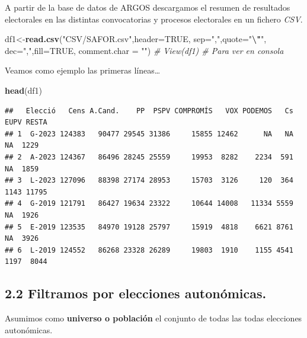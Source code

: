 \documentclass[
]{article}
\newenvironment{Shaded}{\begin{snugshade}}{\end{snugshade}}
\newcommand{\AttributeTok}[1]{\textcolor[rgb]{0.13,0.29,0.53}{#1}}
\newcommand{\CommentTok}[1]{\textcolor[rgb]{0.56,0.35,0.01}{\textit{#1}}}
\newcommand{\ConstantTok}[1]{\textcolor[rgb]{0.56,0.35,0.01}{#1}}
\newcommand{\FunctionTok}[1]{\textcolor[rgb]{0.13,0.29,0.53}{\textbf{#1}}}
\newcommand{\NormalTok}[1]{#1}
\newcommand{\OtherTok}[1]{\textcolor[rgb]{0.56,0.35,0.01}{#1}}
\newcommand{\SpecialCharTok}[1]{\textcolor[rgb]{0.81,0.36,0.00}{\textbf{#1}}}
\newcommand{\StringTok}[1]{\textcolor[rgb]{0.31,0.60,0.02}{#1}}
\begin{document}
A partir de la base de datos de ARGOS descargamos el resumen de
resultados electorales en las distintas convocatorias y procesos
electorales en un fichero \emph{CSV}.

\begin{Shaded}
\begin{Highlighting}[]
\NormalTok{  df1}\OtherTok{\textless{}{-}}\FunctionTok{read.csv}\NormalTok{(}\StringTok{"CSV/SAFOR.csv"}\NormalTok{,}\AttributeTok{header=}\ConstantTok{TRUE}\NormalTok{, }\AttributeTok{sep=}\StringTok{","}\NormalTok{,}\AttributeTok{quote=}\StringTok{"}\SpecialCharTok{\textbackslash{}"}\StringTok{\textquotesingle{}"}\NormalTok{, }\AttributeTok{dec=}\StringTok{","}\NormalTok{,}\AttributeTok{fill=}\ConstantTok{TRUE}\NormalTok{,}
                \AttributeTok{comment.char =} \StringTok{""}\NormalTok{)}
  \CommentTok{\# View(df1) \# Para ver en consola}
\end{Highlighting}
\end{Shaded}

Veamos como ejemplo las primeras líneas\ldots{}

\begin{Shaded}
\begin{Highlighting}[]
\FunctionTok{head}\NormalTok{(df1)}
\end{Highlighting}
\end{Shaded}

\begin{verbatim}
##   Elecció   Cens A.Cand.    PP  PSPV COMPROMÍS   VOX PODEMOS   Cs EUPV RESTA
## 1  G-2023 124383   90477 29545 31386     15855 12462      NA   NA   NA  1229
## 2  A-2023 124367   86496 28245 25559     19953  8282    2234  591   NA  1859
## 3  L-2023 127096   88398 27174 28953     15703  3126     120  364 1143 11795
## 4  G-2019 121791   86427 19634 23322     10644 14008   11334 5559   NA  1926
## 5  E-2019 123535   84970 19128 25797     15919  4818    6621 8761   NA  3926
## 6  L-2019 124552   86268 23328 26289     19803  1910    1155 4541 1197  8044
\end{verbatim}

\hypertarget{filtramos-por-elecciones-autonuxf3micas.}{%
\subsection{2.2 Filtramos por elecciones
autonómicas.}\label{filtramos-por-elecciones-autonuxf3micas.}}

Asumimos como \textbf{universo o población} el conjunto de todas las
todas elecciones autonómicas.
\end{document}
